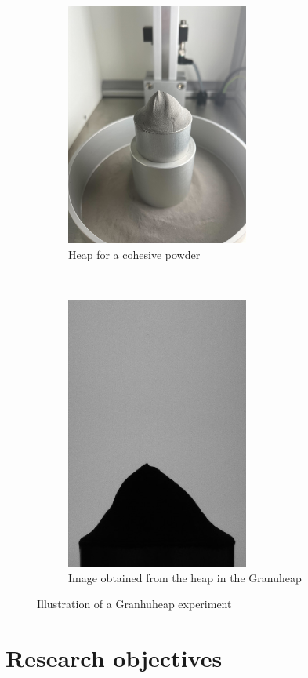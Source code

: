 \documentclass[12pt]{article}
\begin{document}
\begin{figure}[t!]
  \centering
  \begin{subfigure}[b]{0.45\textwidth}
      \centering
      \includegraphics[width=6cm]{images/IMG_4098.jpg}
      \caption{Heap for a cohesive powder} \label{fig::raw_heap}
    \end{subfigure}%
  ~ 
  \begin{subfigure}[b]{0.45\textwidth}
      \centering
      \includegraphics[width=6cm]{images/heap-4.jpg}
      \caption{Image obtained from the heap in the Granuheap} \label{fig::proc_heap}
    \end{subfigure}
  \caption{Illustration of a Granhuheap experiment}
\end{figure}

\FloatBarrier

\section{Research objectives}
\end{document}
